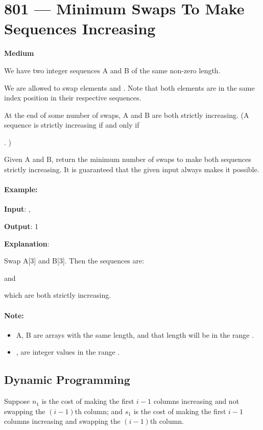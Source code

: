\section{801 --- Minimum Swaps To Make Sequences Increasing}

\textbf{Medium}

We have two integer sequences A and B of the same non-zero length.

We are allowed to swap elements  and .  Note that both elements are in the same index position in their respective sequences.

At the end of some number of swaps, A and B are both strictly increasing. (A sequence is strictly increasing if and only if 

. )

Given A and B, return the minimum number of swaps to make both sequences strictly increasing.  It is guaranteed that the given input always makes it possible.

\paragraph{Example:}

\begin{flushleft}
\textbf{Input}: , 

\textbf{Output}: 1

\textbf{Explanation}: 

Swap A[3] and B[3].  Then the sequences are:

 and 

which are both strictly increasing.
\end{flushleft}

\paragraph{Note:}

\begin{itemize}
\item A, B are arrays with the same length, and that length will be in the range \fcj{[1, 1000]}.

\item {},  are integer values in the range \fcj{[0, 2000]}.
\end{itemize}

\subsection{Dynamic Programming}
Suppose $n_1$ is the cost of making the first $i-1$ columns increasing and not swapping the $(i-1)$th column; and $s_1$ is the cost of making the first $i-1$ columns increasing and swapping the $(i-1)$th column.

